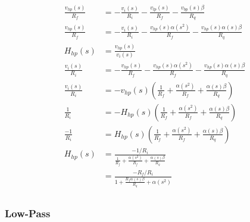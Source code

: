 \documentclass{article}
\begin{document}
\begin{equation*}
\begin{split}
  \frac{v_{hp}(s)}{R_f} & = - \frac{v_i(s)}{R_i} - \frac{v_{lp}(s)}{R_f} - \frac{v_{bp}(s)\beta}{R_q} \\
  \frac{v_{hp}(s)}{R_f} & = - \frac{v_i(s)}{R_i} - \frac{v_{hp}(s)\alpha(s^2)}{R_f} - \frac{v_{hp}(s)\alpha(s)\beta}{R_q} \\
  H_{hp}(s) & = \frac{v_{hp}(s)}{v_i(s)} \\
  \frac{v_i(s)}{R_i} & = - \frac{v_{hp}(s)}{R_f} - \frac{v_{hp}(s)\alpha(s^2)}{R_f} - \frac{v_{hp}(s)\alpha(s)\beta}{R_q} \\
  \frac{v_i(s)}{R_i} & = - v_{hp}(s)(\frac{1}{R_f} + \frac{\alpha(s^2)}{R_f} + \frac{\alpha(s)\beta}{R_q}) \\
  \frac{1}{R_i} & = - H_{hp}(s)(\frac{1}{R_f} + \frac{\alpha(s^2)}{R_f} + \frac{\alpha(s)\beta}{R_q}) \\
  \frac{-1}{R_i} & = H_{hp}(s)(\frac{1}{R_f} + \frac{\alpha(s^2)}{R_f} + \frac{\alpha(s)\beta}{R_q}) \\
  H_{hp}(s) & = \frac{-1/R_i}{\frac{1}{R_f} + \frac{\alpha(s^2)}{R_f} + \frac{\alpha(s)\beta}{R_q}} \\
  & = \frac{-R_f/R_i}{1 + \frac{R_f\alpha(s)\beta}{R_q} + \alpha(s^2) } \\
\end{split}
\end{equation*}

\subsubsection{Low-Pass}
\end{document}
